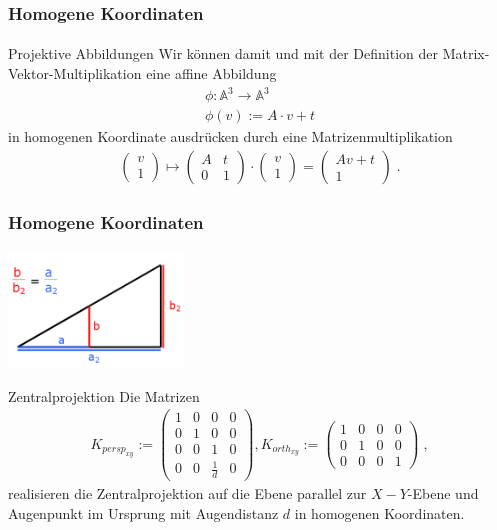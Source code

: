 \documentclass{beamer}
\begin{document}
\begin{frame}
    \frametitle{Homogene Koordinaten}
\framesubtitle{}
\begin{block}{Projektive Abbildungen}
Wir können damit und mit der Definition der Matrix-Vektor-Multiplikation eine affine Abbildung 
\begin{align*}
\phi : \mathbb{A}^{3} \to \mathbb{A}^{3} \\
\phi(v):=  A \cdot v + t
\end{align*}
in homogenen Koordinate ausdrücken durch eine Matrizenmultiplikation
\begin{align*}
\begin{pmatrix} v \\ 1\end{pmatrix} \mapsto \begin{pmatrix}  A  & t  \\ 0 &1\end{pmatrix} \cdot  \begin{pmatrix} v \\ 1\end{pmatrix}  =    \begin{pmatrix}  A v +t   \\ 1\end{pmatrix}  \; .
\end{align*}
\end{block}
\end{frame}

\begin{frame}
    \frametitle{Homogene Koordinaten}
\framesubtitle{}
\begin{center}
    \includegraphics[width=0.35\textwidth]{images/strahlensatz}
\end{center}
\begin{block}{Zentralprojektion}
Die Matrizen
\begin{align*}
K_{persp_{xy}} := \begin{pmatrix}  
1   &  0 & 0 & 0  \\
0   &  1 & 0 & 0  \\
0   &  0 & 1 & 0  \\
0   &  0 & \frac{1}{d} & 0 
\end{pmatrix} ,
K_{orth_{xy}} := \begin{pmatrix}  
1   &  0 & 0 & 0  \\
0   &  1 & 0 & 0  \\
0   &  0 & 0 & 1  
\end{pmatrix} \; ,
\end{align*}
realisieren die Zentralprojektion auf die Ebene parallel zur $X-Y$-Ebene und Augenpunkt im Ursprung mit Augendistanz $d$ in homogenen Koordinaten.


\end{block}
\end{frame}
\end{document}
